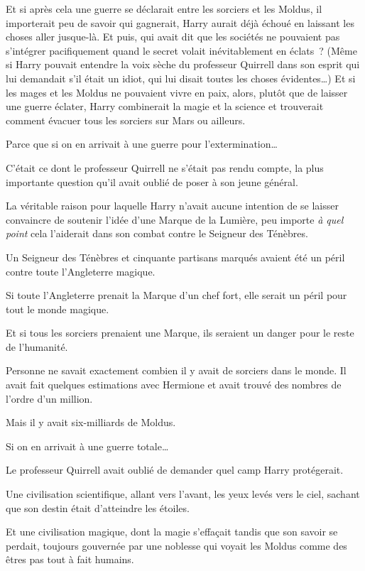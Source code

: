 Et si après cela une guerre se déclarait entre les sorciers et les Moldus, il importerait peu de savoir qui gagnerait, Harry aurait déjà échoué en laissant les choses aller jusque-là.
Et puis, qui avait dit que les sociétés ne pouvaient pas s'intégrer pacifiquement quand le secret volait inévitablement en éclats~?
(Même si Harry pouvait entendre la voix sèche du professeur Quirrell dans son esprit qui lui demandait s'il était un idiot, qui lui disait toutes les choses évidentes…) Et si les mages et les Moldus ne pouvaient vivre en paix, alors, plutôt que de laisser une guerre éclater, Harry combinerait la magie et la science et trouverait comment évacuer tous les sorciers sur Mars ou ailleurs.

Parce que si on en arrivait à une guerre pour l'extermination…

C'était ce dont le professeur Quirrell ne s'était pas rendu compte, la plus importante question qu'il avait oublié de poser à son jeune général.

La véritable raison pour laquelle Harry n'avait aucune intention de se laisser convaincre de soutenir l'idée d'une Marque de la Lumière, peu importe \emph{à quel point} cela l'aiderait dans son combat contre le Seigneur des Ténèbres.

Un Seigneur des Ténèbres et cinquante partisans marqués avaient été un péril contre toute l'Angleterre magique.

Si toute l'Angleterre prenait la Marque d'un chef fort, elle serait un péril pour tout le monde magique.

Et si tous les sorciers prenaient une Marque, ils seraient un danger pour le reste de l'humanité.

Personne ne savait exactement combien il y avait de sorciers dans le monde.
Il avait fait quelques estimations avec Hermione et avait trouvé des nombres de l'ordre d'un million.

Mais il y avait six-milliards de Moldus.

Si on en arrivait à une guerre totale…

Le professeur Quirrell avait oublié de demander quel camp Harry protégerait.

Une civilisation scientifique, allant vers l'avant, les yeux levés vers le ciel, sachant que son destin était d'atteindre les étoiles.

Et une civilisation magique, dont la magie s'effaçait tandis que son savoir se perdait, toujours gouvernée par une noblesse qui voyait les Moldus comme des êtres pas tout à fait humains.

